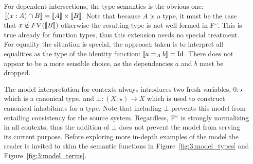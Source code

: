 For dependent intersections, the type semantics is the obvious one: $\llbracket (x : A) \cap B \rrbracket = \llbracket A \rrbracket \times \llbracket B \rrbracket$.
Note that because $A$ is a type, it must be the case that $x \notin FV(\llbracket B \rrbracket)$ otherwise the resulting type is not well-formed in F$^\omega$.
This is true already for function types, thus this extension needs no special treatment.
For equality the situation is special, the approach taken is to interpret all equalities as the type of the identity function: $\llbracket a =_A b \rrbracket = \textnormal{Id}$.
There does not appear to be a more sensible choice, as the dependencies $a$ and $b$ must be dropped.



The model interpretation for contexts always introduces two fresh variables, $0 : \star$ which is a canonical type, and $\bot : (X : \star) \to X$ which is used to construct canonical inhabitants for a type.
Note that including $\bot$ prevents this model from entailing consistency for the source system.
Regardless, F$^\omega$ is strongly normalizing in all contexts, thus the addition of $\bot$ does not prevent the model from serving its current purpose.
Before exploring more in-depth examples of the model the reader is invited to skim the semantic functions in Figure~\ref{fig:3:model_types} and Figure~\ref{fig:3:model_terms}.

